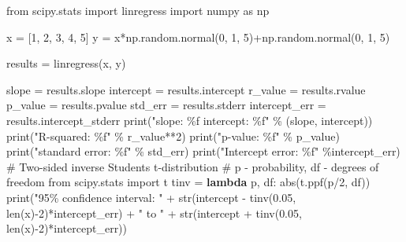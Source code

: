 \documentclass[
  letterpaper,
  DIV=11,
  numbers=noendperiod]{scrreprt}
\newenvironment{Shaded}{\begin{snugshade}}{\end{snugshade}}
\newcommand{\BuiltInTok}[1]{\textcolor[rgb]{0.00,0.23,0.31}{#1}}
\newcommand{\CommentTok}[1]{\textcolor[rgb]{0.37,0.37,0.37}{#1}}
\newcommand{\DecValTok}[1]{\textcolor[rgb]{0.68,0.00,0.00}{#1}}
\newcommand{\FloatTok}[1]{\textcolor[rgb]{0.68,0.00,0.00}{#1}}
\newcommand{\ImportTok}[1]{\textcolor[rgb]{0.00,0.46,0.62}{#1}}
\newcommand{\KeywordTok}[1]{\textcolor[rgb]{0.00,0.23,0.31}{\textbf{#1}}}
\newcommand{\NormalTok}[1]{\textcolor[rgb]{0.00,0.23,0.31}{#1}}
\newcommand{\OperatorTok}[1]{\textcolor[rgb]{0.37,0.37,0.37}{#1}}
\newcommand{\SpecialCharTok}[1]{\textcolor[rgb]{0.37,0.37,0.37}{#1}}
\newcommand{\StringTok}[1]{\textcolor[rgb]{0.13,0.47,0.30}{#1}}
\begin{document}
\begin{Shaded}
\begin{Highlighting}[]
\ImportTok{from}\NormalTok{ scipy.stats }\ImportTok{import}\NormalTok{ linregress}
\ImportTok{import}\NormalTok{ numpy }\ImportTok{as}\NormalTok{ np}

\NormalTok{x }\OperatorTok{=}\NormalTok{ [}\DecValTok{1}\NormalTok{, }\DecValTok{2}\NormalTok{, }\DecValTok{3}\NormalTok{, }\DecValTok{4}\NormalTok{, }\DecValTok{5}\NormalTok{]}
\NormalTok{y }\OperatorTok{=}\NormalTok{ x}\OperatorTok{*}\NormalTok{np.random.normal(}\DecValTok{0}\NormalTok{, }\DecValTok{1}\NormalTok{, }\DecValTok{5}\NormalTok{)}\OperatorTok{+}\NormalTok{np.random.normal(}\DecValTok{0}\NormalTok{, }\DecValTok{1}\NormalTok{, }\DecValTok{5}\NormalTok{)}

\NormalTok{results }\OperatorTok{=}\NormalTok{ linregress(x, y)}

\NormalTok{slope }\OperatorTok{=}\NormalTok{ results.slope}
\NormalTok{intercept }\OperatorTok{=}\NormalTok{ results.intercept}
\NormalTok{r\_value }\OperatorTok{=}\NormalTok{ results.rvalue}
\NormalTok{p\_value }\OperatorTok{=}\NormalTok{ results.pvalue}
\NormalTok{std\_err }\OperatorTok{=}\NormalTok{ results.stderr}
\NormalTok{intercept\_err }\OperatorTok{=}\NormalTok{ results.intercept\_stderr}
\BuiltInTok{print}\NormalTok{(}\StringTok{"slope: }\SpecialCharTok{\%f}\StringTok{    intercept: }\SpecialCharTok{\%f}\StringTok{"} \OperatorTok{\%}\NormalTok{ (slope, intercept))}
\BuiltInTok{print}\NormalTok{(}\StringTok{"R{-}squared: }\SpecialCharTok{\%f}\StringTok{"} \OperatorTok{\%}\NormalTok{ r\_value}\OperatorTok{**}\DecValTok{2}\NormalTok{)}
\BuiltInTok{print}\NormalTok{(}\StringTok{"p{-}value: }\SpecialCharTok{\%f}\StringTok{"} \OperatorTok{\%}\NormalTok{ p\_value)}
\BuiltInTok{print}\NormalTok{(}\StringTok{"standard error: }\SpecialCharTok{\%f}\StringTok{"} \OperatorTok{\%}\NormalTok{ std\_err)}
\BuiltInTok{print}\NormalTok{(}\StringTok{"Intercept error: }\SpecialCharTok{\%f}\StringTok{"} \OperatorTok{\%}\NormalTok{intercept\_err)}
\CommentTok{\# Two{-}sided inverse Students t{-}distribution}
\CommentTok{\# p {-} probability, df {-} degrees of freedom}
\ImportTok{from}\NormalTok{ scipy.stats }\ImportTok{import}\NormalTok{ t}
\NormalTok{tinv }\OperatorTok{=} \KeywordTok{lambda}\NormalTok{ p, df: }\BuiltInTok{abs}\NormalTok{(t.ppf(p}\OperatorTok{/}\DecValTok{2}\NormalTok{, df))}
\BuiltInTok{print}\NormalTok{(}\StringTok{"95}\SpecialCharTok{\% c}\StringTok{onfidence interval: "} \OperatorTok{+} \BuiltInTok{str}\NormalTok{(intercept }\OperatorTok{{-}}\NormalTok{ tinv(}\FloatTok{0.05}\NormalTok{, }\BuiltInTok{len}\NormalTok{(x)}\OperatorTok{{-}}\DecValTok{2}\NormalTok{)}\OperatorTok{*}\NormalTok{intercept\_err) }\OperatorTok{+} \StringTok{" to "} \OperatorTok{+} \BuiltInTok{str}\NormalTok{(intercept }\OperatorTok{+}\NormalTok{ tinv(}\FloatTok{0.05}\NormalTok{, }\BuiltInTok{len}\NormalTok{(x)}\OperatorTok{{-}}\DecValTok{2}\NormalTok{)}\OperatorTok{*}\NormalTok{intercept\_err))}
\end{Highlighting}
\end{Shaded}
\end{document}
